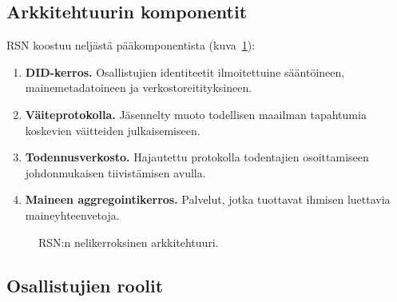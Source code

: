 \documentclass[11pt,a4paper,twocolumn]{article}
\begin{document}
\subsection{Arkkitehtuurin komponentit}

RSN koostuu neljästä pääkomponentista (kuva~\ref{fig:architecture}):
\begin{enumerate}[nosep]
\item \textbf{DID-kerros.} Osallistujien identiteetit ilmoitettuine sääntöineen, mainemetadatoineen ja verkostoreitityksineen.
\item \textbf{Väiteprotokolla.} Jäsennelty muoto todellisen maailman tapahtumia koskevien väitteiden julkaisemiseen.
\item \textbf{Todennusverkosto.} Hajautettu protokolla todentajien osoittamiseen johdonmukaisen tiivistämisen avulla.
\item \textbf{Maineen aggregointikerros.} Palvelut, jotka tuottavat ihmisen luettavia maineyhteenvetoja.
\end{enumerate}

\begin{figure}[ht]
\centering
{}
\caption{RSN:n nelikerroksinen arkkitehtuuri.}
\label{fig:architecture}
\end{figure}

\subsection{Osallistujien roolit}
\end{document}
